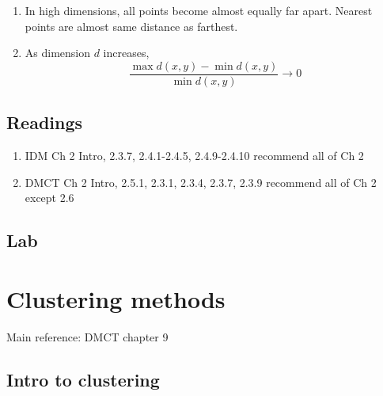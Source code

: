 \documentclass{article}
\begin{document}
\begin{enumerate}
\item In high dimensions, all points become almost equally far apart. Nearest points are almost same distance as farthest.
\item As dimension $d$ increases, 
\[
\frac{\max d(x,y) - \min d(x,y)}{\min d(x,y)} \rightarrow 0
\]
\end{enumerate}

\subsection*{Readings}

\begin{enumerate}
\item IDM Ch 2 Intro, 2.3.7, 2.4.1-2.4.5, 2.4.9-2.4.10 recommend all of Ch 2
\item DMCT Ch 2 Intro, 2.5.1, 2.3.1, 2.3.4, 2.3.7, 2.3.9 recommend all of Ch 2 except 2.6
\end{enumerate}

\subsection*{Lab}


\section*{Clustering methods} 

Main reference: DMCT chapter 9

\subsection*{Intro to clustering}
\end{document}
